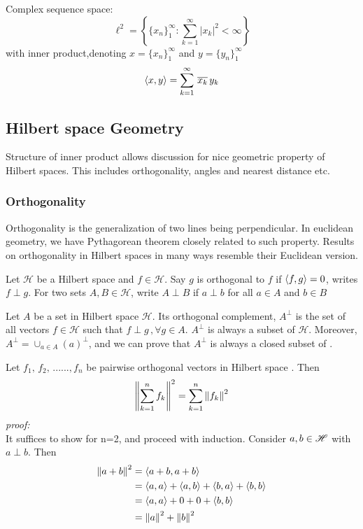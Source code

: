 \begin{example}\rm\nextline
	Complex sequence space:
	$$\ell^2=
		\left\{\{x_n\}_1^\infty:\sum_{k=1}^\infty |x_k|^2<\infty \right\}$$
	with  inner product,denoting $x=\{x_n\}_1^\infty$ and $y=\{y_n\}_1^\infty$
	$$
		\left<{x},{y}\right>=\sum_{k=1}^\infty \,{\overline{x_k}\, y_k}
	$$
\end{example}



\subsection{Hilbert space Geometry}
Structure of inner product allows discussion for nice geometric property of Hilbert spaces. This includes orthogonality, angles and nearest distance etc.

\subsubsection{Orthogonality}
Orthogonality is the generalization of two lines being perpendicular. In euclidean geometry, we have Pythagorean theorem closely related to such property. Results on orthogonality in Hilbert spaces in many ways resemble their Euclidean version.
\begin{definition}[Orthogonality]\rm\nextline
	Let $\mathscr{H}$ be a Hilbert space and $f\in\mathscr{H}$. Say $g$ is orthogonal to $f$ if $\left<{f},{g}\right>=0$, writes $f\perp g$. For two sets $A,B\in \mathscr{H}$, write $A\perp B$ if $a\perp b$ for all $a\in A$ and $b\in B$


\end{definition}

\begin{definition}\rm\label{ortho comp}\nextline
	Let $A$ be a set in Hilbert space $\mathscr{H}$. Its orthogonal complement, $A^{\perp}$ is the set of all vectors $f \in \mathscr{H}$ such
	that $f\perp g\,,\forall g \in A$. $A^\perp$ is always a subset of $\mathscr{H}$. Moreover, $A^\perp=\cup_{a\in A}(a)^\perp$, and we can prove that $A^\perp$ is always a closed subset of \hbs.
\end{definition}

\begin{proposition}\rm\nextline
	Let $f_1,\,f_2,\,......,f_n$ be pairwise orthogonal vectors in Hilbert space \hbs. Then
	$$
		\left\|{\sum_{k=1}^n f_k}\right\|^2={\sum_{k=1}^n \left\|{f_k}\right\|^2}
	$$
	\textit{proof:}\\
	It suffices to show for n=2, and proceed with induction. Consider $a,b\in \mathscr{H}$ with $a\perp b$.
	Then
	\begin{equation}
		\begin{split}
			\left\|{a+b}\right\|^2&=\left<{a+b},{a+b}\right>\\
			&=\left<{a},{a}\right>+\left<{a},{b}\right>+\left<{b},{a}\right>+\left<{b},{b}\right>\\
			&=\left<{a},{a}\right>+0+0+\left<{b},{b}\right>\\
			&=\left\|{a}\right\|^2+\left\|{b}\right\|^2
		\end{split}
	\end{equation}


\end{proposition}

